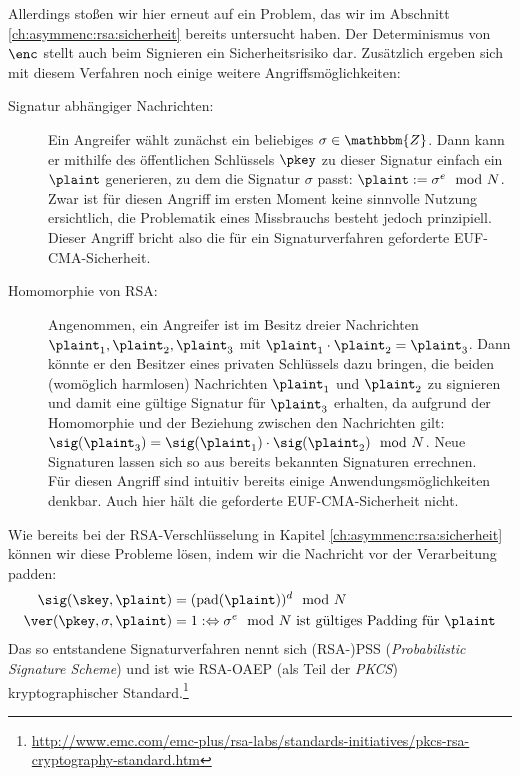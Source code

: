 Allerdings stoßen wir hier erneut auf ein Problem, das wir im Abschnitt \ref{ch:asymmenc:rsa:sicherheit} bereits untersucht haben. Der Determinismus von $\enc$ stellt auch beim Signieren ein Sicherheitsrisiko dar. Zusätzlich ergeben sich mit diesem Verfahren noch einige weitere Angriffsmöglichkeiten:

\begin{description}
    \item[Signatur abhängiger Nachrichten:] Ein Angreifer wählt zunächst ein beliebiges $\sigma \in \mathbbm{Z}$. Dann kann er mithilfe des öffentlichen Schlüssels $\pkey$ zu dieser Signatur einfach ein $\plaint$ generieren, zu dem die Signatur $\sigma$ passt: $\plaint := \sigma^e \mod N$.\\
    Zwar ist für diesen Angriff im ersten Moment keine sinnvolle Nutzung ersichtlich, die Problematik eines Missbrauchs besteht jedoch prinzipiell. Dieser Angriff bricht also die für ein Signaturverfahren geforderte EUF-CMA-Sicherheit.
    \item[Homomorphie von RSA:] Angenommen, ein Angreifer ist im Besitz dreier Nachrichten $\plaint_1,\plaint_2,\plaint_3$ mit $\plaint_1 \cdot \plaint_2 = \plaint_3$. Dann könnte er den Besitzer eines privaten Schlüssels dazu bringen, die beiden (womöglich harmlosen) Nachrichten $\plaint_1$ und $\plaint_2$ zu signieren und damit eine gültige Signatur für $\plaint_3$ erhalten, da aufgrund der Homomorphie und der Beziehung zwischen den Nachrichten gilt:
    $\sig(\plaint_3) = \sig(\plaint_1) \cdot \sig(\plaint_2) \mod N$. Neue Signaturen lassen sich so aus bereits bekannten Signaturen errechnen.\\
    Für diesen Angriff sind intuitiv bereits einige Anwendungsmöglichkeiten denkbar. Auch hier hält die geforderte EUF-CMA-Sicherheit nicht.
\end{description}
Wie bereits bei der RSA-Verschlüsselung in Kapitel \ref{ch:asymmenc:rsa:sicherheit} können wir diese Probleme lösen, indem wir die Nachricht vor der Verarbeitung padden:
\begin{align*}
\sig(\skey,\plaint) &= (\text{pad}(\plaint))^d \mod N\\
\ver(\pkey,\sigma,\plaint) &= 1 :\Leftrightarrow \sigma^e \mod N \text{ ist gültiges Padding für } \plaint
\end{align*}
Das so entstandene Signaturverfahren nennt sich (RSA-)PSS (\emph{Probabilistic Signature Scheme}) und ist wie RSA-OAEP (als Teil der \emph{PKCS}) kryptographischer Standard.\footnote{\url{http://www.emc.com/emc-plus/rsa-labs/standards-initiatives/pkcs-rsa-cryptography-standard.htm}}


